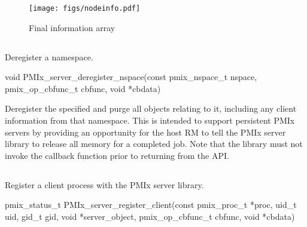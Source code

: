 \begingroup
\begin{figure*}[ht!]
  \begin{center}
    \texttt{[image: figs/nodeinfo.pdf]}
  \end{center}
  \caption{Final information array}
  \label{fig:nodeinfo}
\end{figure*}
\endgroup


\subsection{}

\summary

Deregister a namespace.

\format

\cspecificstart
\begin{codepar}
void PMIx_server_deregister_nspace(const pmix_nspace_t nspace,
                        pmix_op_cbfunc_t cbfunc, void *cbdata)
\end{codepar}
\cspecificend

\begin{arglist}
\end{arglist}

\descr

Deregister the specified  and purge all objects relating to it, including any client information from that namespace.
This is intended to support persistent \ac{PMIx} servers by providing an opportunity for the host \ac{RM} to tell the \ac{PMIx} server library to release all memory for a completed job. Note that the library must not invoke the callback function prior to returning from the \ac{API}.


\subsection{}

\summary

Register a client process with the PMIx server library.

\format

\cspecificstart
\begin{codepar}
pmix_status_t
PMIx_server_register_client(const pmix_proc_t *proc,
                        uid_t uid, gid_t gid,
                        void *server_object,
                        pmix_op_cbfunc_t cbfunc, void *cbdata)
\end{codepar}
\cspecificend


